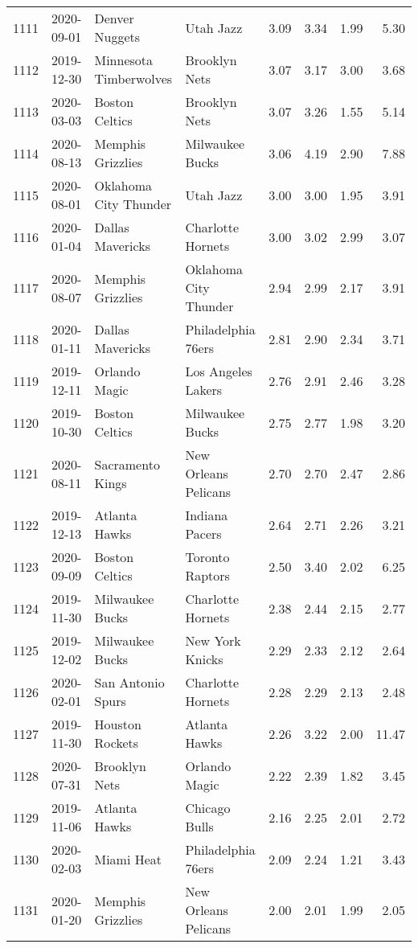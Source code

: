 \documentclass[
  11pt,
]{article}
\theoremstyle{nonumberplain}
\begin{document}
\begin{longtable}{rl|llr|rrr}
1111 & 2020-09-01 & Denver Nuggets & Utah Jazz & 3.09 & 3.34 & 1.99 & 5.30\\
1112 & 2019-12-30 & Minnesota Timberwolves & Brooklyn Nets & 3.07 & 3.17 & 3.00 & 3.68\\
1113 & 2020-03-03 & Boston Celtics & Brooklyn Nets & 3.07 & 3.26 & 1.55 & 5.14\\
1114 & 2020-08-13 & Memphis Grizzlies & Milwaukee Bucks & 3.06 & 4.19 & 2.90 & 7.88\\
1115 & 2020-08-01 & Oklahoma City Thunder & Utah Jazz & 3.00 & 3.00 & 1.95 & 3.91\\
1116 & 2020-01-04 & Dallas Mavericks & Charlotte Hornets & 3.00 & 3.02 & 2.99 & 3.07\\
1117 & 2020-08-07 & Memphis Grizzlies & Oklahoma City Thunder & 2.94 & 2.99 & 2.17 & 3.91\\
1118 & 2020-01-11 & Dallas Mavericks & Philadelphia 76ers & 2.81 & 2.90 & 2.34 & 3.71\\
1119 & 2019-12-11 & Orlando Magic & Los Angeles Lakers & 2.76 & 2.91 & 2.46 & 3.28\\
1120 & 2019-10-30 & Boston Celtics & Milwaukee Bucks & 2.75 & 2.77 & 1.98 & 3.20\\
1121 & 2020-08-11 & Sacramento Kings & New Orleans Pelicans & 2.70 & 2.70 & 2.47 & 2.86\\
1122 & 2019-12-13 & Atlanta Hawks & Indiana Pacers & 2.64 & 2.71 & 2.26 & 3.21\\
1123 & 2020-09-09 & Boston Celtics & Toronto Raptors & 2.50 & 3.40 & 2.02 & 6.25\\
1124 & 2019-11-30 & Milwaukee Bucks & Charlotte Hornets & 2.38 & 2.44 & 2.15 & 2.77\\
1125 & 2019-12-02 & Milwaukee Bucks & New York Knicks & 2.29 & 2.33 & 2.12 & 2.64\\
1126 & 2020-02-01 & San Antonio Spurs & Charlotte Hornets & 2.28 & 2.29 & 2.13 & 2.48\\
1127 & 2019-11-30 & Houston Rockets & Atlanta Hawks & 2.26 & 3.22 & 2.00 & 11.47\\
1128 & 2020-07-31 & Brooklyn Nets & Orlando Magic & 2.22 & 2.39 & 1.82 & 3.45\\
1129 & 2019-11-06 & Atlanta Hawks & Chicago Bulls & 2.16 & 2.25 & 2.01 & 2.72\\
1130 & 2020-02-03 & Miami Heat & Philadelphia 76ers & 2.09 & 2.24 & 1.21 & 3.43\\
1131 & 2020-01-20 & Memphis Grizzlies & New Orleans Pelicans & 2.00 & 2.01 & 1.99 & 2.05\\

\end{longtable}
\end{document}
